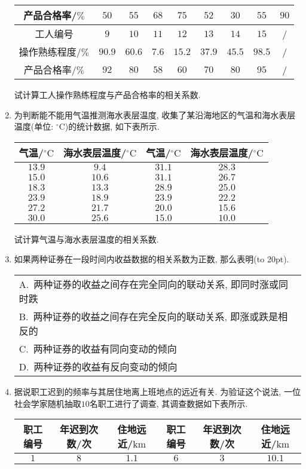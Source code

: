 \documentclass[10pt,a4paper]{article}
\newcommand{\bracket}[1]{(\hbox to #1pt{})}
\newcommand{\onech}[4]{\par\begin{tabular}{p{.9\textwidth}}
A.~#1\\
B.~#2\\
C.~#3\\
D.~#4
\end{tabular}}
\begin{document}
\begin{enumerate}[1.]
\begin{center}
\begin{tabular}{|c|c|c|c|c|c|c|c|c|}
产品合格率/$\%$ & $50$ & $55$ & $68$ & $75$ & $52$ & $30$ & $55$ & $90$ \\ \hline
工人编号 & $9$ & $10$ & $11$ & $12$ & $13$ & $14$ & $15$ & / \\ \hline
操作熟练程度/$\%$ & $90.9$ & $60.6$ & $7.6$ & $15.2$ & $37.9$ & $45.5$ & $98.5$ & / \\ \hline
产品合格率/$\%$ & $92$ & $80$ & $58$ & $60$ & $70$ & $80$ & $95$ & / \\ \hline
\end{tabular}
\end{center}
试计算工人操作熟练程度与产品合格率的相关系数.
\item 为判断能不能用气温推测海水表层温度, 收集了某沿海地区的气温和海水表层温度(单位: $^\circ\text{C}$)的统计数据, 如下表所示.
\begin{center}
\begin{longtable}{|c|c|c|c|}
\hline
气温/$^\circ\text{C}$ & 海水表层温度/$^\circ\text{C}$ & 气温/$^\circ\text{C}$ & 海水表层温度/$^\circ\text{C}$ \\ \hline
\endhead
$13.9$ & $9.4$ & $31.1$ & $28.3$ \\ \hline
$15.0$ & $10.6$ & $31.1$ & $26.7$ \\ \hline
$18.3$ & $13.3$ & $28.9$ & $25.0$ \\ \hline
$23.9$ & $18.9$ & $23.9$ & $22.2$ \\ \hline
$27.2$ & $21.7$ & $20.0$ & $15.6$ \\ \hline
$30.0$ & $25.6$ & $15.0$ & $10.0$ \\ \hline
\end{longtable}
\end{center}
试计算气温与海水表层温度的相关系数.
\item 如果两种证券在一段时间内收益数据的相关系数为正数, 那么表明\bracket{20}.
\onech{两种证券的收益之间存在完全同向的联动关系, 即同时涨或同时跌}{两种证券的收益之间存在完全反向的联动关系, 即涨或跌是相反的}{两种证券的收益有同向变动的倾向}{两种证券的收益有反向变动的倾向}
\item 据说职工迟到的频率与其居住地离上班地点的远近有关. 为验证这个说法, 一位社会学家随机抽取$10$名职工进行了调查, 其调查数据如下表所示.
\begin{center}
\begin{tabular}{|c|c|c|c|c|c|}
\hline
职工编号  & 年迟到次数/次 & 住地远近/$\text{km}$ & 职工编号 & 年迟到次数/次 & 住地远近/$\text{km}$ \\ \hline
$1$ & $8$ & $1.1$ & $6$ & $3$ & $10.1$ \\ \hline

\end{tabular}
\end{center}
\end{enumerate}
\end{document}
